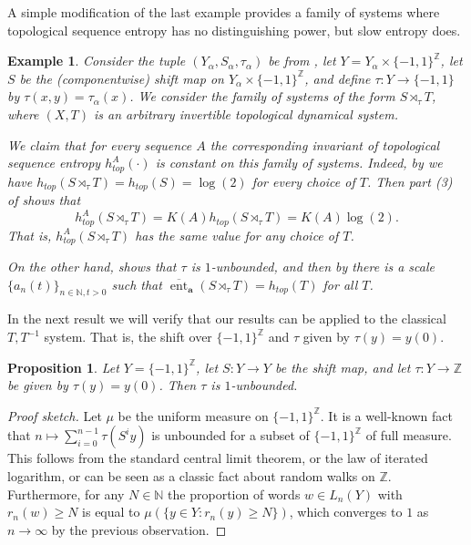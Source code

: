 \documentclass[a4paper,oneside]{amsart}
\renewcommand{\(}{\begin{dmath*}}
\renewcommand{\)}{\end{dmath*}}
\newtheorem{proposition}[theorem]{Proposition}
\newtheorem{example}[theorem]{Example}
\theoremstyle{definition}
\newcommand{\N}{\mathbb{N}}
\newcommand{\Z}{\mathbb{Z}}
\newcommand{\upperent}{\overline{\operatorname{ent}}}
\begin{document}
A simple modification of the last example provides a family of systems where topological sequence entropy has no distinguishing power, but slow entropy does.  
\begin{example}\label{example:slow-entropy-and-sequence-entropy}
    Consider the tuple $(Y_{\alpha},S_{\alpha},\tau_{\alpha})$ be from  , let $Y=Y_{\alpha}\times \{-1,1\}^\Z$, let $S$ be the (componentwise) shift map on $Y_{\alpha}\times \{-1,1\}^\Z$, and define $\tau\colon Y\to\{-1,1\}$ by $\tau(x,y)=\tau_{\alpha}(x)$. We consider the family of systems of the form $S\rtimes_\tau T$, where $(X,T)$ is an arbitrary invertible topological dynamical system.
    

    We claim that for every sequence $A$ the corresponding invariant of topological sequence entropy  $h_{top}^A(\cdot)$ is constant on this family of systems. Indeed, by  we have $h_{top}(S\rtimes_{\tau}T)=h_{top}(S)=\log(2)$ for every choice of $T$. Then  part (3) of  shows that
    \[h^A_{top}(S\rtimes_{\tau}T)=K(A)h_{top}(S\rtimes_\tau T)=K(A)\log(2).\] 
    That is, $h^A_{top}(S\rtimes_{\tau}T)$ has the same value for any choice of $T$. 
    
    On the other hand,  shows that $\tau$ is $1$-unbounded, and then by   there is 
    a scale $\{a_n(t)\}_{n\in\N,t>0}$  such that $\upperent_{\textbf{a}}(S\rtimes_{\tau}T)=h_{top}(T)$ for all $T$.  
\end{example}
In the next result we will verify that our results can be applied to the classical $T,T^{-1}$ system. That is, the shift over $\{-1,1\}^\Z$ and $\tau$ given by $\tau(y)=y(0)$.  
\begin{proposition}\label{fullshift-unbounded}
    Let $Y=\{-1,1\}^\Z$, let $S\colon Y\to Y$ be the shift map, and let $\tau\colon Y\to\Z$ be given by $\tau(y)=y(0)$. Then $\tau$ is $1$-unbounded.
\end{proposition}
\begin{proof}[Proof sketch]
    Let $\mu$ be the uniform measure on $\{-1,1\}^\Z$. It is a well-known fact that $n\mapsto \sum_{i=0}^{n-1}\tau(S^iy)$ is unbounded for a subset of $\{-1,1\}^\Z$ of full measure. This follows from the standard central limit theorem, or the law of iterated logarithm, or can be seen as a classic fact about random walks on $\Z$. Furthermore, for any $N\in\N$ the proportion of words $w\in L_n(Y)$ with $r_n(w)\geq N$ is equal to  $\mu(\{y\in Y : r_n(y)\geq N\})$, which converges to $1$ as $n\to\infty$ by the previous observation. 
\end{proof} 
\end{document}
